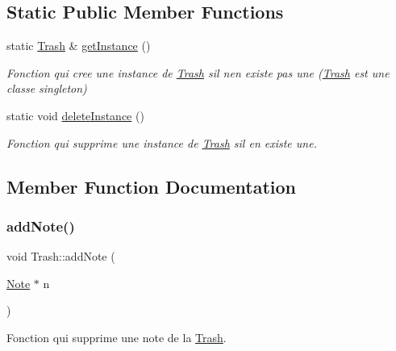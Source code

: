 \subsection*{Static Public Member Functions}
\begin{DoxyCompactItemize}
\item 
\mbox{\label{class_trash_a7c07d5024656cf5770ab910482e717c9}} 
static \hyperlink{class_trash}{Trash} \& \hyperlink{class_trash_a7c07d5024656cf5770ab910482e717c9}{get\+Instance} ()
\begin{DoxyCompactList}\small\item\em Fonction qui cree une instance de \hyperlink{class_trash}{Trash} s\textquotesingle{}il n\textquotesingle{}en existe pas une (\hyperlink{class_trash}{Trash} est une classe singleton) \end{DoxyCompactList}\item 
\mbox{\label{class_trash_a45bcb2383f6114f7e5d3e2f3ad62e938}} 
static void \hyperlink{class_trash_a45bcb2383f6114f7e5d3e2f3ad62e938}{delete\+Instance} ()
\begin{DoxyCompactList}\small\item\em Fonction qui supprime une instance de \hyperlink{class_trash}{Trash} s\textquotesingle{}il en existe une. \end{DoxyCompactList}\end{DoxyCompactItemize}


\subsection{Member Function Documentation}
\mbox{\label{class_trash_a938c113450a14db9ff01d5747723f073}} 
\subsubsection{\texorpdfstring{add\+Note()}{addNote()}}
{\footnotesize\ttfamily void Trash\+::add\+Note (\begin{DoxyParamCaption}\item[{\hyperlink{class_note}{Note} $\ast$}]{n }\end{DoxyParamCaption})}



Fonction qui supprime une note de la \hyperlink{class_trash}{Trash}. 


